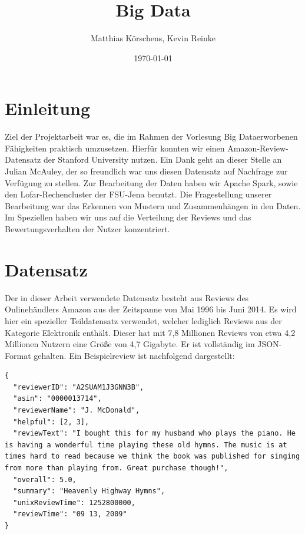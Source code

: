 \documentclass{scrartcl}
\theoremstyle{my_th_style}
\begin{document}
\subject{Projektarbeit}%
\title{Big Data}%
\author{Matthias Körschens, Kevin Reinke}%
\date{\today}%
\maketitle%
\tableofcontents
\begingroup
\let\cleardoublepage\relax
\section{Einleitung}
Ziel der Projektarbeit war es, die im Rahmen der Vorlesung \glqq Big Data\grqq  erworbenen Fähigkeiten praktisch umzusetzen. Hierfür konnten wir einen Amazon-Review-Datensatz der Stanford University nutzen. Ein Dank geht an dieser Stelle an Julian McAuley, der so freundlich war uns diesen Datensatz auf Nachfrage zur Verfügung zu stellen. Zur Bearbeitung der Daten haben wir Apache Spark, sowie den Lofar-Rechencluster der FSU-Jena benutzt. Die Fragestellung unserer Bearbeitung war das Erkennen von Mustern und Zusammenhängen in den Daten. Im Speziellen haben wir uns auf die Verteilung der Reviews und das Bewertungsverhalten der Nutzer konzentriert.
\section{Datensatz}
Der in dieser Arbeit verwendete Datensatz besteht aus Reviews des Onlinehändlers Amazon aus der Zeitspanne von Mai 1996 bis Juni 2014. Es wird hier ein spezieller Teildatensatz verwendet, welcher lediglich Reviews aus der Kategorie Elektronik enthält. Dieser hat mit 7,8 Millionen Reviews von etwa 4,2 Millionen Nutzern eine Größe von 4,7 Gigabyte. Er ist vollständig im JSON-Format gehalten. Ein Beispielreview ist nachfolgend dargestellt:

\begin{lstlisting}[breaklines=true]
{ 
  "reviewerID": "A2SUAM1J3GNN3B", 
  "asin": "0000013714", 
  "reviewerName": "J. McDonald", 
  "helpful": [2, 3], 
  "reviewText": "I bought this for my husband who plays the piano. He is having a wonderful time playing these old hymns. The music is at times hard to read because we think the book was published for singing from more than playing from. Great purchase though!", 
  "overall": 5.0, 
  "summary": "Heavenly Highway Hymns", 
  "unixReviewTime": 1252800000, 
  "reviewTime": "09 13, 2009" 
}
\end{lstlisting}
\end{document}
